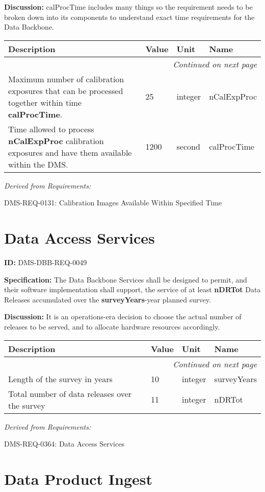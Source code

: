 \documentclass[SE,toc,lsstdraft]{lsstdoc}
\makeatletter
\newcommand{\paramname}[1]{\hspace{0pt}#1}
\newcommand{\unitname}[1]{\hspace{0pt}#1}
\newenvironment{parameters}[0]{%
\setlength\LTleft{0pt}
\setlength\LTright{\fill}
\begin{small}
\begin{longtable}[]{|p{0.49\textwidth}|l|p{0.6in}|p{1.70in}@{}|}

\hline \textbf{Description} & \textbf{Value} & \textbf{Unit} & \textbf{Name} \\ \hline
\endhead

\hline \multicolumn{4}{r}{\emph{Continued on next page}} \\
\endfoot

\hline\hline
\endlastfoot
}{%
\hline
\end{longtable}
\end{small}
}
\makeatother
\begin{document}
\textbf{Discussion:}
calProcTime includes many things so the requirement needs to be broken down into its components to understand exact time requirements for the Data Backbone.

\begin{parameters}

Maximum number of calibration exposures that can be processed together within time \textbf{calProcTime}.

&
25
&
\unitname{%
integer
}
&
\paramname{%
nCalExpProc
} \\\hline
Time allowed to process \textbf{nCalExpProc} calibration exposures and have them available within the DMS.
&
1200
&
\unitname{%
second
}
&
\paramname{%
calProcTime
} \\\hline
\end{parameters}

\emph{Derived from Requirements:}

DMS-REQ-0131:
Calibration Images Available Within Specified Time \newline

\section{Data Access Services}

\label{DMS-DBB-REQ-0049}
\textbf{ID:} DMS-DBB-REQ-0049

\textbf{Specification:}
The Data Backbone Services shall be designed to permit, and their software implementation shall support, the service of at least \textbf{nDRTot} Data Releases accumulated over the \textbf{surveyYears}-year planned survey.

\textbf{Discussion:}
It is an operations-era decision to choose the actual number of releases to be served, and to allocate hardware resources accordingly.

\begin{parameters}
Length of the survey in years
&
10
&
\unitname{%
integer
}
&
\paramname{%
surveyYears
} \\\hline
Total number of data releases over the survey
&
11
&
\unitname{%
integer
}
&
\paramname{%
nDRTot
} \\\hline
\end{parameters}

\emph{Derived from Requirements:}

DMS-REQ-0364:
Data Access Services \newline

\section{Data Product Ingest}
\end{document}
